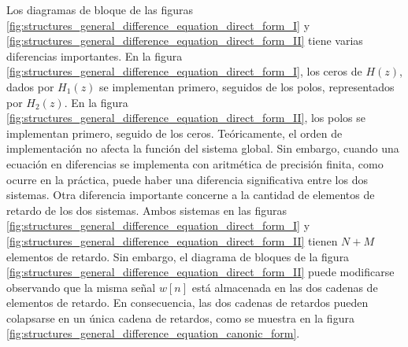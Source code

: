 \documentclass[a4paper]{report}
\begin{document}
Los diagramas de bloque de las figuras \ref{fig:structures_general_difference_equation_direct_form_I} y \ref{fig:structures_general_difference_equation_direct_form_II} tiene varias diferencias importantes. En la figura \ref{fig:structures_general_difference_equation_direct_form_I}, los ceros de \(H(z)\), dados por \(H_1(z)\) se implementan primero, seguidos de los polos, representados por \(H_2(z)\). En la figura \ref{fig:structures_general_difference_equation_direct_form_II}, los polos se implementan primero, seguido de los ceros. Teóricamente, el orden de implementación no afecta la función del sistema global. Sin embargo, cuando una ecuación en diferencias se implementa con aritmética de precisión finita, como ocurre en la práctica, puede haber una diferencia significativa entre los dos sistemas. Otra diferencia importante concerne a la cantidad de elementos de retardo de los dos sistemas. Ambos sistemas en las figuras \ref{fig:structures_general_difference_equation_direct_form_I} y \ref{fig:structures_general_difference_equation_direct_form_II} tienen \(N+M\) elementos de retardo. Sin embargo, el diagrama de bloques de la figura \ref{fig:structures_general_difference_equation_direct_form_II} puede modificarse observando que la misma señal \(w[n]\) está almacenada en las dos cadenas de elementos de retardo. En consecuencia, las dos cadenas de retardos pueden colapsarse en un única cadena de retardos, como se muestra en la figura \ref{fig:structures_general_difference_equation_canonic_form}.
\end{document}
